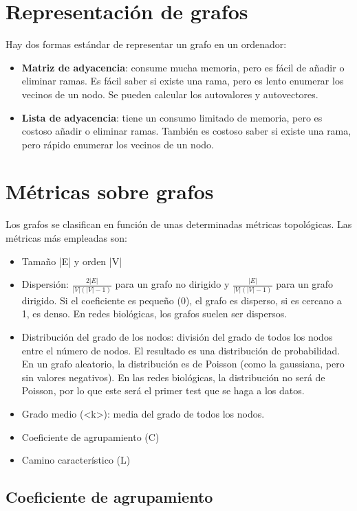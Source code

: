 \section{Representación de grafos}
Hay dos formas estándar de representar un grafo en un ordenador:
\begin{itemize}
\item \textbf{Matriz de adyacencia}: consume mucha memoria, pero es fácil de añadir o eliminar ramas. Es fácil saber si existe una rama, pero es lento enumerar los vecinos de un nodo. Se pueden calcular los autovalores y autovectores.
\item \textbf{Lista de adyacencia}: tiene un consumo limitado de memoria, pero es costoso añadir o eliminar ramas. También es costoso saber si existe una rama, pero rápido enumerar los vecinos de un nodo.
\end{itemize}

\section{Métricas sobre grafos}
Los grafos se clasifican en función de unas determinadas métricas topológicas. Las métricas más empleadas son:
\begin{itemize}
\item Tamaño |E| y orden |V|
\item Dispersión: $\frac{2 |E|}{|V| (|V| - 1)}$ para un grafo no dirigido y $\frac{|E|}{|V| (|V| - 1)}$ para un grafo dirigido. Si el coeficiente es pequeño (0), el grafo es disperso, si es cercano a 1, es denso. En redes biológicas, los grafos suelen ser dispersos.
\item Distribución del grado de los nodos: división del grado de todos los nodos entre el número de nodos. El resultado es una distribución de probabilidad. En un grafo aleatorio, la distribución es de Poisson (como la gaussiana, pero sin valores negativos). En las redes biológicas, la distribución no será de Poisson, por lo que este será el primer test que se haga a los datos. 
\item Grado medio (<k>): media del grado de todos los nodos.
\item Coeficiente de agrupamiento (C)
 \
\item Camino característico (L)
\end{itemize}

\subsection{Coeficiente de agrupamiento}


